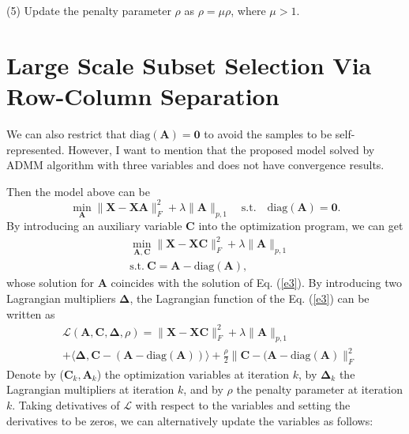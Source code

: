 \documentclass[10pt,twocolumn,letterpaper]{article}
\begin{document}
(5) Update the penalty parameter $\rho$ as $\rho=\mu\rho$, where $\mu>1$.


\section{Large Scale Subset Selection Via Row-Column Separation}



We can also restrict that $\text{diag}(\bm{A})=\bm{0}$ to avoid the samples to be self-represented. However, I want to mention that the proposed model solved by ADMM algorithm with three variables and does not have convergence results.

Then the model above can be 
\begin{equation}
\label{e2}
\min_{\bm{A}}
\|
\bm{X}
-
\bm{X}\bm{A}
\|_{F}^{2}
+
\lambda
\|
\bm{A}
\|_{p,1}
\quad
\text{s.t.}
\quad
\text{diag}(\bm{A})=\bm{0}.
\end{equation}
By introducing an auxiliary variable $\bm{C}$ into the optimization program, we can get
\begin{equation}
\begin{split}
\label{e3}
&
\min_{\bm{A},\bm{C}}
\|
\bm{X}
-
\bm{X}\bm{C}
\|_{F}^{2}
+
\lambda
\|
\bm{A}
\|_{p,1}
\\
& 
\text{s.t.}
\ 
\bm{C}=\bm{A}-\text{diag}(\bm{A}),
\end{split}
\end{equation}
whose solution for $\bm{A}$ coincides with the solution of Eq. (\ref{e3}). By introducing two Lagrangian multipliers $\bm{\Delta}$, the Lagrangian function of the Eq. (\ref{e3}) can be written as
\begin{equation}
\begin{split}
\label{e5}
&
\mathcal{L}
(\bm{A},\bm{C},\bm{\Delta},\rho)
=
\|
\bm{X}
-
\bm{X}\bm{C}
\|_{F}^{2}
+
\lambda
\|
\bm{A}
\|_{p,1}
\\
&
+
\langle
\bm{\Delta},
\bm{C}-(\bm{A}-\text{diag}(\bm{A}))
\rangle
+
\frac{\rho}{2}
\|
\bm{C}-(\bm{A}-\text{diag}(\bm{A})
\|_{F}^{2}
\end{split}
\end{equation}
Denote by ($\bm{C}_{k},\bm{A}_{k}$) the optimization variables at iteration $k$, by $\bm{\Delta}_{k}$ the Lagrangian multipliers at iteration $k$, and by $\rho$ the penalty parameter at iteration $k$. Taking detivatives of $\mathcal{L}$ with respect to the variables and setting the derivatives to be zeros, we can alternatively update the variables as follows:
\end{document}

